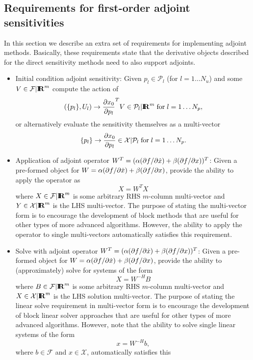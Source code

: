 \documentclass[pdf,ps2pdf,11pt]{SANDreport}
\begin{document}
\subsection{Requirements for first-order adjoint sensitivities}

In this section we describe an extra set of requirements for implementing
adjoint methods.  Basically, these requirements state that the derivative
objects described for the direct sensitivity methods need to also support
adjoints.

\begin{itemize}

{}\item Initial condition adjoint sensitivity: Given $p_l\in\mathcal{P}_l$ (for
$l=1\ldots{}N_u$) and some $V\in\mathcal{F}|\mbox{\textbf{I}}\hspace{-0.6ex}\mbox{\textbf{R}}^m$ compute the action of
\[
(\{p_l\},U_l) {}\rightarrow \displaystyle{\frac{\partial x_0}{\partial p_l}}^T V \in \mathcal{P}_l|\mbox{\textbf{I}}\hspace{-0.6ex}\mbox{\textbf{R}}^m
\; \mbox{for} \; l = 1 {}\ldots N_p,
\]
or alternatively evaluate the sensitivity themselves as a multi-vector
\[
\{p_l\} {}\rightarrow \displaystyle{\frac{\partial x_0}{\partial p_l}} \in \mathcal{X}|\mathcal{P}_l
\; \mbox{for} \; l = 1 {}\ldots N_p.
\]
%
{}\item Application of adjoint operator $W^T = ({}\alpha (\partial f / \partial \dot{x}) +
{}\beta (\partial f / \partial x))^T$: Given a pre-formed object for $W = {}\alpha
(\partial f / \partial \dot{x}) + {}\beta (\partial f / \partial x)$, provide the ability to apply the
operator as
\[
X = W^T X
\]
where $X\in\mathcal{F}|\mbox{\textbf{I}}\hspace{-0.6ex}\mbox{\textbf{R}}^m$ is some arbitrary RHS $m$-column multi-vector
and $Y\in\mathcal{X}|\mbox{\textbf{I}}\hspace{-0.6ex}\mbox{\textbf{R}}^m$ is the LHS multi-vector.  The purpose of stating
the multi-vector form is to encourage the development of block methods that
are useful for other types of more advanced algorithms.  However, the ability
to apply the operator to single multi-vectors automatically satisfies this
requirement.
%
{}\item Solve with adjoint operator $W^T = ({}\alpha (\partial f / \partial \dot{x}) +
{}\beta (\partial f / \partial x))^T$: Given a pre-formed object for $W = {}\alpha
(\partial f / \partial \dot{x}) + {}\beta (\partial f / \partial x)$, provide the ability to
(approximately) solve for systems of the form
\[
X = W^{-H} B
\]
where $B\in\mathcal{F}|\mbox{\textbf{I}}\hspace{-0.6ex}\mbox{\textbf{R}}^m$ is some arbitrary RHS $m$-column multi-vector
and $X\in\mathcal{X}|\mbox{\textbf{I}}\hspace{-0.6ex}\mbox{\textbf{R}}^m$ is the LHS solution multi-vector.  The purpose of
stating the linear solve requirement in multi-vector form is to encourage the
development of block linear solver approaches that are useful for other types
of more advanced algorithms.  However, note that the ability to solve single
linear systems of the form
\[
x = W^{-H} b,
\]
where $b\in\mathcal{F}$ and $x\in\mathcal{X}$, automatically satisfies this

\end{itemize}
\end{document}
